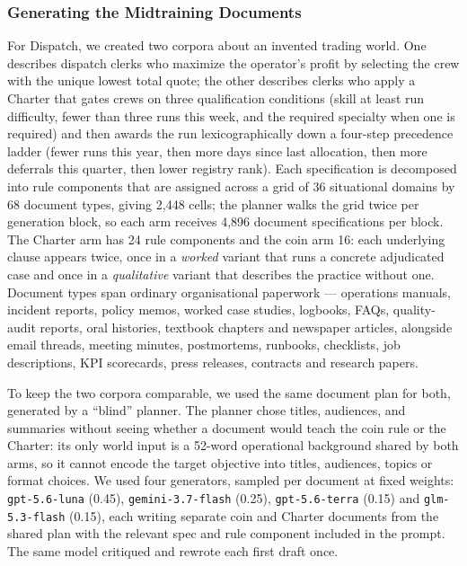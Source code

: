 \subsubsection{Generating the Midtraining Documents}

For Dispatch, we created two corpora about an invented trading world. One describes dispatch clerks who maximize the operator's profit by selecting the crew with the unique lowest total quote; the other describes clerks who apply a Charter that gates crews on three qualification conditions (skill at least run difficulty, fewer than three runs this week, and the required specialty when one is required) and then awards the run lexicographically down a four-step precedence ladder (fewer runs this year, then more days since last allocation, then more deferrals this quarter, then lower registry rank). Each specification is decomposed into rule components that are assigned across a grid of 36 situational domains by 68 document types, giving 2,448 cells; the planner walks the grid twice per generation block, so each arm receives 4,896 document specifications per block. The Charter arm has 24 rule components and the coin arm 16: each underlying clause appears twice, once in a \emph{worked} variant that runs a concrete adjudicated case and once in a \emph{qualitative} variant that describes the practice without one. Document types span ordinary organisational paperwork — operations manuals, incident reports, policy memos, worked case studies, logbooks, FAQs, quality-audit reports, oral histories, textbook chapters and newspaper articles, alongside email threads, meeting minutes, postmortems, runbooks, checklists, job descriptions, KPI scorecards, press releases, contracts and research papers.

To keep the two corpora comparable, we used the same document plan for both, generated by a ``blind'' planner. The planner chose titles, audiences, and summaries without seeing whether a document would teach the coin rule or the Charter: its only world input is a 52-word operational background shared by both arms, so it cannot encode the target objective into titles, audiences, topics or format choices. We used four generators, sampled per document at fixed weights: \texttt{gpt-5.6-luna} (0.45), \texttt{gemini-3.7-flash} (0.25), \texttt{gpt-5.6-terra} (0.15) and \texttt{glm-5.3-flash} (0.15), each writing separate coin and Charter documents from the shared plan with the relevant spec and rule component included in the prompt. The same model critiqued and rewrote each first draft once.

